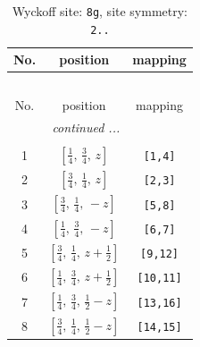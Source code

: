 \documentclass[fleqn,8pt]{jsarticle}
\begin{document}
\renewcommand{\arraystretch}{1.2}
\begin{longtable}{ccc}
\caption{Wyckoff site: {\tt 8g}, site symmetry: {\tt 2..}}
 \\
 \hline \hline
No. & position & mapping \\ \hline \endfirsthead

\multicolumn{2}{l}{\tablename\ \thetable{}} \\
 \hline \hline
No. & position & mapping \\ \hline \endhead

 \hline \hline
\multicolumn{2}{r}{\footnotesize\it continued ...} \\ \endfoot

 \hline \hline
\multicolumn{2}{r}{} \\ \endlastfoot

1 & $\left[ \frac{1}{4},\, \frac{3}{4},\, z \right]$ & {\tt [1,4]} \\ \hline
2 & $\left[ \frac{3}{4},\, \frac{1}{4},\, z \right]$ & {\tt [2,3]} \\ \hline
3 & $\left[ \frac{3}{4},\, \frac{1}{4},\, - z \right]$ & {\tt [5,8]} \\ \hline
4 & $\left[ \frac{1}{4},\, \frac{3}{4},\, - z \right]$ & {\tt [6,7]} \\ \hline
5 & $\left[ \frac{3}{4},\, \frac{1}{4},\, z + \frac{1}{2} \right]$ & {\tt [9,12]} \\ \hline
6 & $\left[ \frac{1}{4},\, \frac{3}{4},\, z + \frac{1}{2} \right]$ & {\tt [10,11]} \\ \hline
7 & $\left[ \frac{1}{4},\, \frac{3}{4},\, \frac{1}{2} - z \right]$ & {\tt [13,16]} \\ \hline
8 & $\left[ \frac{3}{4},\, \frac{1}{4},\, \frac{1}{2} - z \right]$ & {\tt [14,15]} \\
\end{longtable}
\renewcommand{\arraystretch}{1.2}
\end{document}

